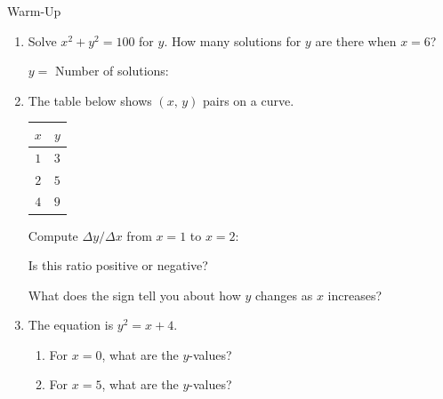 \documentclass[10pt]{article}
\begin{document}
\namedateperiod

\vspace{0.12in}

\begin{notesbox}{Warm-Up}
\begin{enumerate}[leftmargin=1.5em, itemsep=6pt]

\item Solve $x^2 + y^2 = 100$ for $y$. How many solutions for $y$ are there when $x = 6$?

\vspace{0.4in}
$y = $ \blank{4cm} \hfill Number of solutions: \blank{2cm}
\vspace{0.1in}

\item The table below shows $(x,\, y)$ pairs on a curve.

\vspace{4pt}
\renewcommand{\arraystretch}{1.3}
\begin{tabular}{c|c}
$x$ & $y$ \\\hline
$1$ & $3$ \\
$2$ & $5$ \\
$4$ & $9$ \\
\end{tabular}

\vspace{6pt}
Compute $\Delta y / \Delta x$ from $x = 1$ to $x = 2$: \blank{3cm}

Is this ratio positive or negative? \blank{3cm}

What does the sign tell you about how $y$ changes as $x$ increases? \blank{6cm}

\vspace{0.1in}

\item The equation is $y^2 = x + 4$.
\begin{enumerate}[leftmargin=1.2em, itemsep=4pt]
    \item[(a)] For $x = 0$, what are the $y$-values? \blank{4cm}
    \item[(b)] For $x = 5$, what are the $y$-values? \blank{4cm}
\end{enumerate}

\end{enumerate}
\end{notesbox}
\end{document}
